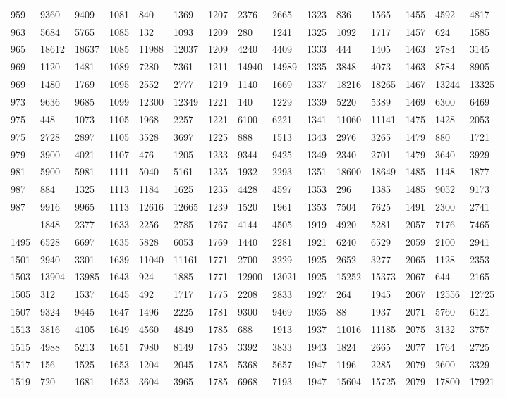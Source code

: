 \begin{longtable}{*4{A@{\hspace*{5mm}}A}}
	959&9360&9409&1081&840&1369&1207&2376&2665&1323&836&1565&1455&4592&4817\\
	963&5684&5765&1085&132&1093&1209&280&1241&1325&1092&1717&1457&624&1585\\
	965&18612&18637&1085&11988&12037&1209&4240&4409&1333&444&1405&1463&2784&3145\\
	969&1120&1481&1089&7280&7361&1211&14940&14989&1335&3848&4073&1463&8784&8905\\
	969&1480&1769&1095&2552&2777&1219&1140&1669&1337&18216&18265&1467&13244&13325\\
	973&9636&9685&1099&12300&12349&1221&140&1229&1339&5220&5389&1469&6300&6469\\
	975&448&1073&1105&1968&2257&1221&6100&6221&1341&11060&11141&1475&1428&2053\\
	975&2728&2897&1105&3528&3697&1225&888&1513&1343&2976&3265&1479&880&1721\\
	979&3900&4021&1107&476&1205&1233&9344&9425&1349&2340&2701&1479&3640&3929\\
	981&5900&5981&1111&5040&5161&1235&1932&2293&1351&18600&18649&1485&1148&1877\\
	987&884&1325&1113&1184&1625&1235&4428&4597&1353&296&1385&1485&9052&9173\\
	987&9916&9965&1113&12616&12665&1239&1520&1961&1353&7504&7625&1491&2300&2741\\
	&1848&2377&1633&2256&2785&1767&4144&4505&1919&4920&5281&2057&7176&7465\\
	1495&6528&6697&1635&5828&6053&1769&1440&2281&1921&6240&6529&2059&2100&2941\\
	1501&2940&3301&1639&11040&11161&1771&2700&3229&1925&2652&3277&2065&1128&2353\\
	1503&13904&13985&1643&924&1885&1771&12900&13021&1925&15252&15373&2067&644&2165\\
	1505&312&1537&1645&492&1717&1775&2208&2833&1927&264&1945&2067&12556&12725\\
	1507&9324&9445&1647&1496&2225&1781&9300&9469&1935&88&1937&2071&5760&6121\\
	1513&3816&4105&1649&4560&4849&1785&688&1913&1937&11016&11185&2075&3132&3757\\
	1515&4988&5213&1651&7980&8149&1785&3392&3833&1943&1824&2665&2077&1764&2725\\
	1517&156&1525&1653&1204&2045&1785&5368&5657&1947&1196&2285&2079&2600&3329\\
	1519&720&1681&1653&3604&3965&1785&6968&7193&1947&15604&15725&2079&17800&17921\\

\end{longtable}
